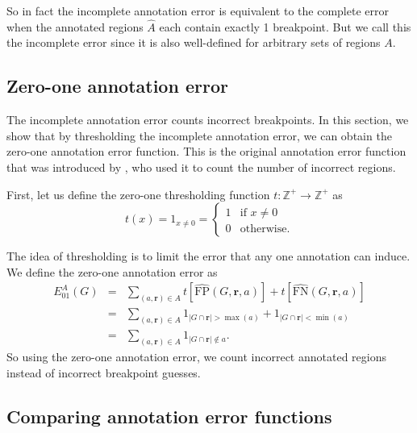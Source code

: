 \documentclass{jsfds} %
\renewcommand{\r}{ \mathbf{ r} }
\begin{document}
So in fact the incomplete annotation error is equivalent to the
complete error when the annotated regions $\hat A$ each contain
exactly 1 breakpoint. But we call this the incomplete error since it
is also well-defined for arbitrary sets of regions $A$.


\newpage

\subsection{Zero-one annotation error}
\label{sec:zero-one}

The incomplete annotation error counts incorrect breakpoints. In this
section, we show that by thresholding the incomplete annotation error,
we can obtain the zero-one annotation error function. This is the
original annotation error function that was introduced by
\citet{HOCKING-breakpoints}, who used it to count the number of
incorrect regions.

First, let us define the zero-one thresholding function
$t:\mathbb Z^+\rightarrow\mathbb Z^+$ as
\begin{equation}
  \label{eq:thresholding}
  t(x)=1_{x\neq 0} =
  \begin{cases}
    1 & \text{if }x\neq 0\\
    0 & \text{otherwise}.
  \end{cases}
\end{equation}

The idea of thresholding is to limit the error that any one annotation
can induce. We define the zero-one annotation error as
\begin{eqnarray}
  \label{eq:ann01err}
  E_{01}^{A}(G)
&=&\nonumber
 \sum_{(a, \r)\in A} 
t\left[\hat{\text{FP}}(G,\r,a)\right]+
t\left[\hat{\text{FN}}(G,\r,a)\right]\\
&=&\nonumber
 \sum_{(a, \r)\in A} 
1_{|G\cap\r|>\max(a)}+
1_{|G\cap \r|<\min(a)}\\
&=&
 \sum_{(a, \r)\in A} 
1_{|G\cap\r|\not\in a}.
\end{eqnarray}
So using the zero-one annotation error, we count incorrect annotated
regions instead of incorrect breakpoint guesses.  

\newpage

\subsection{Comparing annotation error functions}
\end{document}
